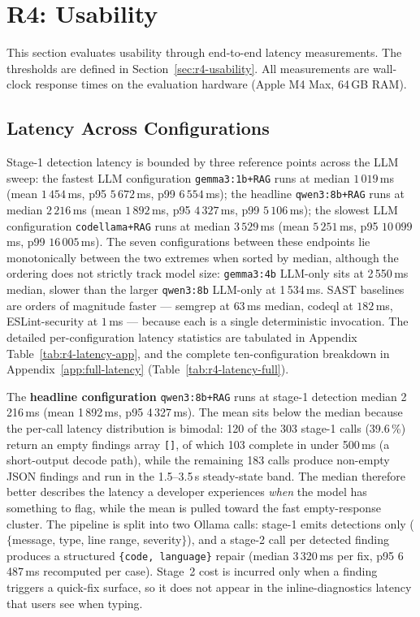 \section{R4: Usability}
\label{sec:eval-r4}

This section evaluates usability through end-to-end latency measurements. The thresholds are defined in Section~\ref{sec:r4-usability}. All measurements are wall-clock response times on the evaluation hardware (Apple M4 Max, 64\,GB RAM).

\subsection{Latency Across Configurations}

Stage-1 detection latency is bounded by three reference points across the LLM sweep: the fastest LLM configuration \texttt{gemma3:1b+RAG} runs at median $1\,019$\,ms (mean $1\,454$\,ms, p95 $5\,672$\,ms, p99 $6\,554$\,ms); the headline \texttt{qwen3:8b+RAG} runs at median $2\,216$\,ms (mean $1\,892$\,ms, p95 $4\,327$\,ms, p99 $5\,106$\,ms); the slowest LLM configuration \texttt{codellama+RAG} runs at median $3\,529$\,ms (mean $5\,251$\,ms, p95 $10\,099$\,ms, p99 $16\,005$\,ms). The seven configurations between these endpoints lie monotonically between the two extremes when sorted by median, although the ordering does not strictly track model size: \texttt{gemma3:4b} LLM-only sits at 2\,550\,ms median, slower than the larger \texttt{qwen3:8b} LLM-only at 1\,534\,ms. SAST baselines are orders of magnitude faster --- semgrep at $63$\,ms median, codeql at $182$\,ms, ESLint-security at $1$\,ms --- because each is a single deterministic invocation. The detailed per-configuration latency statistics are tabulated in Appendix Table~\ref{tab:r4-latency-app}, and the complete ten-configuration breakdown in Appendix~\ref{app:full-latency} (Table~\ref{tab:r4-latency-full}).

The \textbf{headline configuration} \texttt{qwen3:8b+RAG} runs at stage-1 detection median 2\,216\,ms (mean 1\,892\,ms, p95 4\,327\,ms). The mean sits below the median because the per-call latency distribution is bimodal: 120 of the 303 stage-1 calls (39.6\,\%) return an empty findings array \texttt{[]}, of which 103 complete in under 500\,ms (a short-output decode path), while the remaining 183 calls produce non-empty JSON findings and run in the 1.5--3.5\,s steady-state band. The median therefore better describes the latency a developer experiences \emph{when} the model has something to flag, while the mean is pulled toward the fast empty-response cluster. The pipeline is split into two Ollama calls: stage-1 emits detections only ($\{$message, type, line range, severity$\}$), and a stage-2 call per detected finding produces a structured \texttt{\{code, language\}} repair (median 3\,320\,ms per fix, p95 6\,487\,ms recomputed per case). Stage~2 cost is incurred only when a finding triggers a quick-fix surface, so it does not appear in the inline-diagnostics latency that users see when typing.

